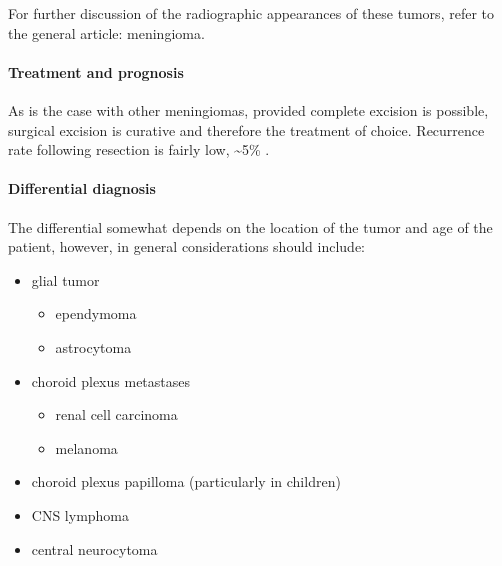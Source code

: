 For further discussion of the radiographic appearances of these tumors, refer to the general article: meningioma.

\paragraph{Treatment and prognosis}

As is the case with other meningiomas, provided complete excision is possible, surgical excision is curative and therefore the treatment of choice. Recurrence rate following resection is fairly low, \textasciitilde5\% .


\paragraph{Differential diagnosis}

The differential somewhat depends on the location of the tumor and age of the patient, however, in general considerations should include:

\begin{itemize}
	\tightlist
	\item
	glial tumor
	
	\begin{itemize}
		\tightlist
		\item
		ependymoma
		\item
		astrocytoma
	\end{itemize}
	\item
	choroid plexus metastases
	
	\begin{itemize}
		\tightlist
		\item
		renal cell carcinoma
		\item
		melanoma
	\end{itemize}
	\item
	choroid plexus papilloma (particularly in children)
	\item
	CNS lymphoma
	\item
	central neurocytoma
\end{itemize}